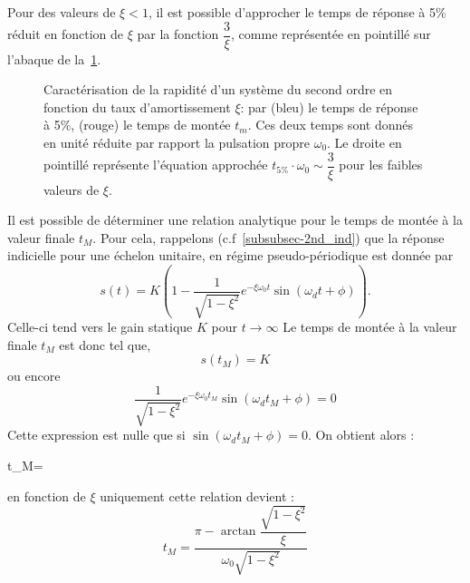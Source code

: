 Pour des valeurs de $\xi<1$, il est possible d'approcher le temps de 
réponse à 5\% réduit en fonction de $\xi$ par la fonction $\dfrac{3}{\xi}$,
comme représentée en pointillé sur l'abaque de 
la~\cref{fig-2nd_temps_reponse_1}.
\begin{figure}[!h]
    \centering
    
    \caption{Caractérisation de la rapidité d'un système du second ordre en
             fonction du taux d'amortissement $\xi$: par
             (bleu) le temps de réponse à 5\%,  
             (rouge) le temps de montée $t_m$.
             Ces deux temps sont donnés en unité réduite
             par rapport la pulsation propre $\omega_0$.
             Le droite en pointillé représente l'équation approchée 
             $t_{5\%}\cdot\omega_0\sim\dfrac{3}{\xi}$ pour les faibles valeurs 
             de $\xi$.
             \label{fig-2nd_temps_reponse_1}}
\end{figure}
Il est possible de déterminer une relation analytique pour le temps
de montée à la valeur finale $t_{M}$. Pour cela, rappelons 
(c.f~\cref{subsubsec-2nd_ind}) 
que la réponse indicielle pour une échelon unitaire, en régime 
pseudo-périodique est donnée par 
\[
s(t) = K \left( 1 - 
       \dfrac{1}{\sqrt{1-\xi^2}} 
       e^{-\xi\omega_0 t}
       \sin{(\omega_d t+\phi)}\right).\label{eq-2-3_2nd} 
\]
Celle-ci tend vers le gain statique $K$ pour $t\to\infty$
Le temps de montée à la valeur finale $t_{M}$ est donc tel que, 
\[
s(t_{M})=K
\]
ou encore  
\[
\dfrac{1}{\sqrt{1-\xi^2}}e^{-\xi\omega_0 t_{M}}\sin{(\omega_d t_{M}+\phi)}=0
\]
Cette expression est nulle que si $\sin{(\omega_d t_{M}+\phi)}=0$.
On obtient alors :
\begin{bequation}
t_{M}=\label{eq-tM}
\end{bequation}
en fonction de $\xi$ uniquement cette relation devient :
\[
t_{M}=\dfrac{\pi-\arctan{\dfrac{\sqrt{1-\xi^2}}{\xi}}}{\omega_0\sqrt{1-\xi^2}}
\]

